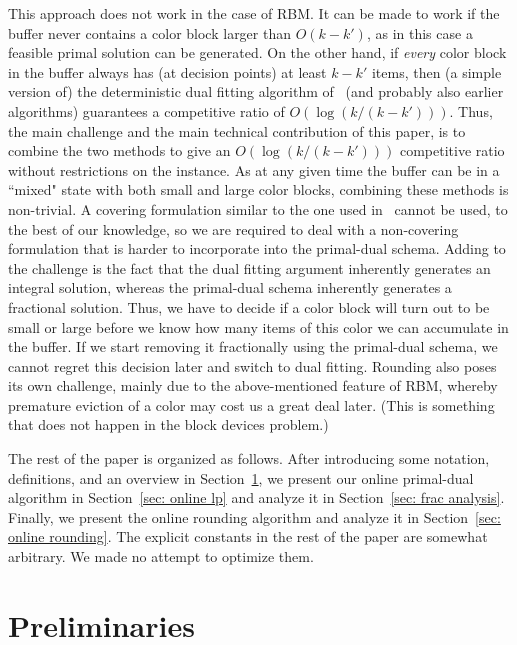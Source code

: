 \documentclass[12pt]{article}
\begin{document}
This approach does not work in the case of RBM. It can be made
to work if the buffer never contains a color block larger than
$O(k-k')$, as in this case a feasible primal solution can be
generated.
On the other hand, if {\em every} color block in the buffer
always has (at decision points) at least $k-k'$ items, then
(a simple version of)
the deterministic dual fitting algorithm of~\cite{AR10} (and
probably also earlier algorithms) guarantees a competitive
ratio of $O(\log(k/(k-k')))$. Thus, the main challenge and
the main technical contribution of this paper, is to combine
the two methods to give an $O(\log(k/(k-k')))$ competitive
ratio without restrictions on the instance. As at any given
time the buffer can be in a ``mixed" state with both small
and large color blocks, combining these methods is non-trivial.
A covering formulation similar to the one used in~\cite{ACER12}
cannot be used, to the best of our knowledge, so we are
required to deal with a non-covering formulation that is
harder to incorporate into the primal-dual schema. Adding 
to the challenge is the fact that the dual fitting argument
inherently generates an integral solution, whereas the 
primal-dual schema inherently
generates a fractional solution. Thus, we have to decide if
a color block will turn out to be small or large before we know
how many items of this color we can accumulate in the buffer.
If we start removing it fractionally using the primal-dual schema, 
we cannot regret this decision later and switch to dual fitting.
Rounding also poses its own challenge, mainly due to the
above-mentioned feature of RBM, whereby premature eviction
of a color may cost us a great deal later. (This is something
that does not happen in the block devices problem.)

The rest of the paper is organized as follows. After
introducing some notation, definitions, and an
overview in Section~\ref{sec: preliminaries}, we present
our online primal-dual algorithm in Section~\ref{sec: online lp} 
and analyze it in Section~\ref{sec: frac analysis}. Finally,
we present the online rounding algorithm and analyze
it in Section~\ref{sec: online rounding}. The explicit 
constants in the rest of the paper are somewhat
arbitrary. We made no attempt to optimize them.




\section{Preliminaries}\label{sec: preliminaries}
\end{document}
